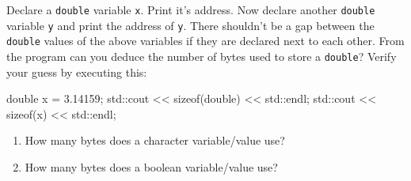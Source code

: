 \begin{ex}
Declare a \texttt{double} variable \texttt{x}. Print it's address. Now declare another \texttt{double} variable \texttt{y} and print the address of \texttt{y}. There shouldn't be a gap between the \texttt{double} values of the above variables if they are declared next to each other. From the program can you deduce the number of bytes used to store a \texttt{double}? Verify your guess by executing this:
\begin{consolethree}[escapeinside=||]
double x = 3.14159;
std::cout << sizeof(double) << std::endl;
std::cout << sizeof(x) << std::endl;
\end{consolethree}
\end{ex}
\begin{ex}
\begin{enumerate}
\item
  How many bytes does a character variable/value use?
\item
  How many bytes does a boolean variable/value use?
\end{enumerate}
\end{ex}
